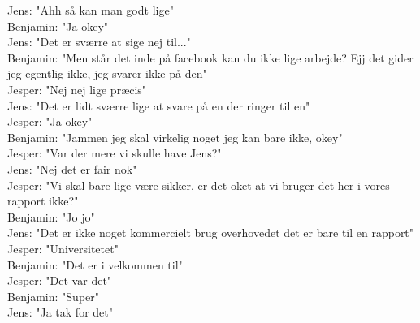 Jens: "Ahh så kan man godt lige"\\
Benjamin: "Ja okey"\\
Jens: "Det er sværre at sige nej til..."\\
Benjamin: "Men står det inde på facebook kan du ikke lige arbejde? Ejj det gider jeg egentlig ikke, jeg svarer ikke på den"\\
Jesper: "Nej nej lige præcis"\\
Jens: "Det er lidt sværre lige at svare på en der ringer til en"\\
Jesper: "Ja okey"\\
Benjamin: "Jammen jeg skal virkelig noget jeg kan bare ikke, okey"\\
Jesper: "Var der mere vi skulle have Jens?"\\
Jens: "Nej det er fair nok"\\
Jesper: "Vi skal bare lige være sikker, er det oket at vi bruger det her i vores rapport ikke?"\\
Benjamin: "Jo jo"\\
Jens: "Det er ikke noget kommercielt brug overhovedet det er bare til en rapport"\\
Jesper: "Universitetet"\\
Benjamin: "Det er i velkommen til"\\
Jesper: "Det var det"\\
Benjamin: "Super"\\
Jens: "Ja tak for det"\\

